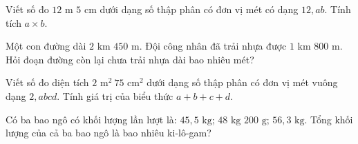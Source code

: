 \begin{ex} %
Viết số đo $12\text{ m } 5\text{ cm}$ dưới dạng số thập phân có đơn vị mét có dạng $12{,}ab$. Tính tích $a \times b$.
\end{ex}

\begin{ex} %
Một con đường dài $2\text{ km } 450\text{ m}$. Đội công nhân đã trải nhựa được $1\text{ km } 800\text{ m}$. Hỏi đoạn đường còn lại chưa trải nhựa dài bao nhiêu mét?
\end{ex}

\begin{ex} %
Viết số đo diện tích $2\text{ m}^2\ 75\text{ cm}^2$ dưới dạng số thập phân có đơn vị mét vuông dạng $2{,}abcd$. Tính giá trị của biểu thức $a + b + c + d$.
\end{ex}

\begin{ex} %
Có ba bao ngô có khối lượng lần lượt là: $45{,}5\text{ kg}$; $48\text{ kg } 200\text{ g}$; $56{,}3\text{ kg}$. Tổng khối lượng của cả ba bao ngô là bao nhiêu ki-lô-gam?
\end{ex}
